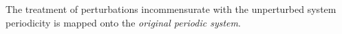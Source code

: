 \begin{frame}[allowframebreaks]
  The treatment of perturbations incommensurate with the unperturbed system
  periodicity is mapped onto the \emph{original periodic system}.
 
\end{frame}

